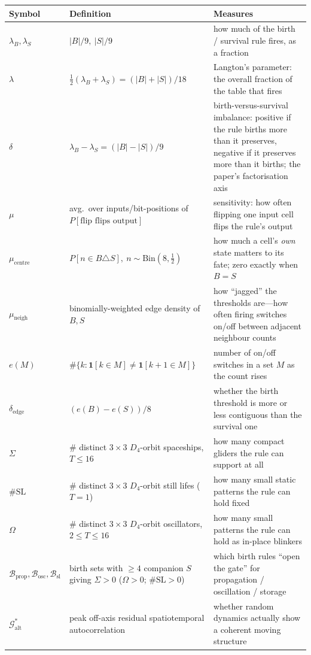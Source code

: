 \documentclass{article}
\begin{document}
\begin{table}[h]
\centering
\small
\renewcommand{\arraystretch}{1.25}
\begin{tabular}{llp{6.2cm}}
\toprule
Symbol & Definition & Measures \\
\midrule
$\lambda_B,\lambda_S$ & $|B|/9,\ |S|/9$ & how much of the birth / survival rule fires, as a fraction \\
$\lambda$ & $\tfrac12(\lambda_B+\lambda_S)=(|B|+|S|)/18$ & Langton's parameter: the overall fraction of the table that fires \\
$\delta$ & $\lambda_B-\lambda_S=(|B|-|S|)/9$ & birth-versus-survival imbalance: positive if the rule births more than it preserves, negative if it preserves more than it births; the paper's factorisation axis \\
$\mu$ & avg.\ over inputs/bit-positions of $P[\text{flip flips output}]$ & sensitivity: how often flipping one input cell flips the rule's output \\
$\mu_{\text{centre}}$ & $P[n\in B\triangle S],\ n\sim\mathrm{Bin}(8,\tfrac12)$ & how much a cell's \emph{own} state matters to its fate; zero exactly when $B=S$ \\
$\mu_{\text{neigh}}$ & binomially-weighted edge density of $B,S$ & how ``jagged'' the thresholds are---how often firing switches on/off between adjacent neighbour counts \\
$e(M)$ & $\#\{k:\mathbf 1[k\in M]\neq\mathbf 1[k{+}1\in M]\}$ & number of on/off switches in a set $M$ as the count rises \\
$\delta_{\text{edge}}$ & $(e(B)-e(S))/8$ & whether the birth threshold is more or less contiguous than the survival one \\
$\Sigma$ & \# distinct $3{\times}3$ $D_4$-orbit spaceships, $T\le16$ & how many compact gliders the rule can support at all \\
$\#\mathrm{SL}$ & \# distinct $3{\times}3$ $D_4$-orbit still lifes ($T{=}1$) & how many small static patterns the rule can hold fixed \\
$\Omega$ & \# distinct $3{\times}3$ $D_4$-orbit oscillators, $2\le T\le16$ & how many small patterns the rule can hold as in-place blinkers \\
$\mathcal{B}_{\text{prop}},\mathcal{B}_{\text{osc}},\mathcal{B}_{\text{sl}}$ & birth sets with $\ge4$ companion $S$ giving $\Sigma>0$ ($\Omega>0$; $\#\mathrm{SL}>0$) & which birth rules ``open the gate'' for propagation / oscillation / storage \\
$\mathcal{G}^{*}_{\text{alt}}$ & peak off-axis residual spatiotemporal autocorrelation & whether random dynamics actually show a coherent moving structure \\

\end{tabular}
\end{table}
\end{document}
